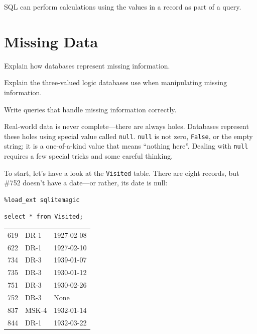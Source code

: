 \documentclass{book}
\begin{document}
\begin{keypoints}
\begin{swcitemize}
\item
  SQL can perform calculations using the values in a record as part of a
  query.
\end{swcitemize}
\end{keypoints}

\section{Missing Data}

\begin{objectives}
\begin{swcitemize}
\item
  Explain how databases represent missing information.
\item
  Explain the three-valued logic databases use when manipulating missing
  information.
\item
  Write queries that handle missing information correctly.
\end{swcitemize}
\end{objectives}

Real-world data is never complete---there are always holes. Databases
represent these holes using special value called \texttt{null}.
\texttt{null} is not zero, \texttt{False}, or the empty string; it is a
one-of-a-kind value that means ``nothing here''. Dealing with
\texttt{null} requires a few special tricks and some careful thinking.

To start, let's have a look at the \texttt{Visited} table. There are
eight records, but \#752 doesn't have a date---or rather, its date is
null:

\begin{verbatim}
%load_ext sqlitemagic
\end{verbatim}

\begin{verbatim}
select * from Visited;
\end{verbatim}

\begin{tabular}{lll}
619 & DR-1 & 1927-02-08 \\
622 & DR-1 & 1927-02-10 \\
734 & DR-3 & 1939-01-07 \\
735 & DR-3 & 1930-01-12 \\
751 & DR-3 & 1930-02-26 \\
752 & DR-3 & None \\
837 & MSK-4 & 1932-01-14 \\
844 & DR-1 & 1932-03-22 \\
\end{tabular}
\end{document}
